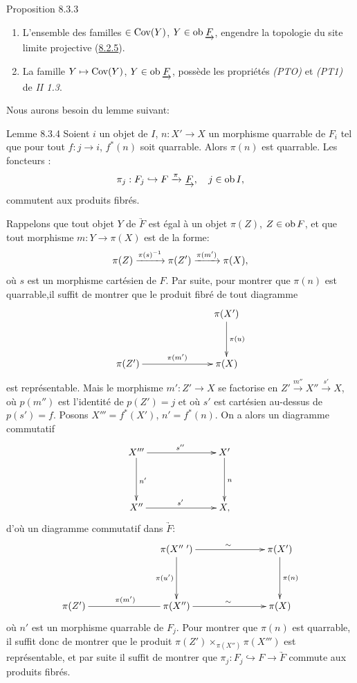 \documentclass[10pt]{../fichiers-configuration-latex/smfart}
\begin{document}
\begin{enonce*}{Proposition 8.3.3}
\begin{enumerate}
\renewcommand{\labelenumi}{\theenumi)}
\item L'ensemble des familles $\in \operatorname{Cov} (Y)$, $Y \in \operatorname{ob}
  \underrightarrow{F}$, engendre la topologie du site limite projective
  (\hyperref[VI.def8.2.5]{8.2.5}).

\item La famille $Y \mapsto \operatorname{Cov} (Y)$, $Y \in \operatorname{ob} \underrightarrow{F}$,
  possède les propriétés \emph{(PTO)} et \emph{(PT1)} de \emph{II 1.3}.
\end{enumerate}
\end{enonce*}

Nous aurons besoin du lemme suivant:

\begin{enonce*}{Lemme 8.3.4}
Soient $i$ un objet de $I$, $n : X'\to X$ un morphisme quarrable de
$F_i$ tel que pour tout $f : j \to i$, $f^{\ast}(n)$ soit
quarrable. Alors $\pi(n)$ est quarrable. Les foncteurs :
$$
\pi_{j} : F_j \hookrightarrow F \xrightarrow{\pi} \underrightarrow{F},\quad j \in
\operatorname{ob} I{},
$$
commutent aux produits fibrés.
\end{enonce*}

Rappelons que tout objet $Y$ de $\underrightarrow{F}$ est égal à un objet
$\pi(Z)$, $Z \in \operatorname{ob} F$, et que tout morphisme $m : Y \to \pi (X)$ est
de la forme:
$$
\pi(Z) \xrightarrow{\pi(s)^{-1}} \pi(Z') \xrightarrow{\pi(m')} \pi(X){},
$$
où $s$ est un morphisme cartésien de $F$. Par suite, pour montrer que
$\pi(n)$ est quarrable,\pageoriginale il suffit de montrer que le
produit fibré de tout diagramme
\[
\xymatrix@C=2.5cm@R=1.25cm{
                           &  \pi(X') \ar[d]^{\pi(u)}\\
 \pi(Z')  \ar[r]^{\pi(m')} & \pi(X)
}
\]
est représentable. Mais le morphisme $m': Z' \to X$ se factorise en
$Z'\xrightarrow{m''} X'' \xrightarrow{s'} X$, où $p(m'')$ est
l'identité de $p(Z') = j$ et où $s'$ est cartésien au-dessus de $p(s')
= f$. Posons $X'''= f^{\ast} (X')$, $n' = f^{\ast}(n)$. On a alors
un diagramme commutatif
\[
\xymatrix@C=2.5cm@R=1.5cm{
X'''         \ar[r]^{s''} \ar[d]^{n'}& X'\ar[d]^{n}        \\
X''         \ar[r]^{s'}  & X,
}
\]
d'où un diagramme commutatif dans $\underrightarrow{F}$:
\[
\xymatrix@C=2.5cm@R=1.5cm{
        & \pi(X''\;')   \ar[r]^{\sim} \ar[d]_{\pi(u')}& \pi(X')\ar[d]^{\pi(n)}\\
\pi(Z')  \ar@{-}[r]^{\pi(m')} & \pi(X'') \ar[r]^{\sim} & \pi(X)
}
\]
où $n'$ est un morphisme quarrable de $F_j$. Pour montrer que $\pi(n)$
est quarrable, il suffit donc de montrer que le produit $\pi(Z')
\times_{\pi(X'')} \pi(X''')$ est représentable, et par suite il
suffit de montrer que $\pi_j : F_j \hookrightarrow F \to
\underrightarrow{F}$ commute aux produits fibrés.
\end{document}
